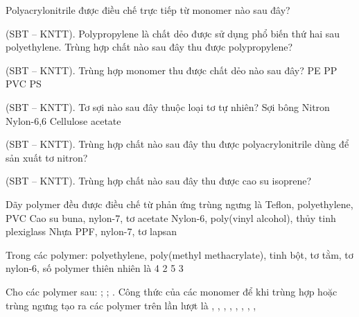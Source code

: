 \documentclass[11pt,a4paper]{article}
\def\loigiai#1{}
\begin{document}
\begin{ex}
Polyacrylonitrile được điều chế trực tiếp từ monomer nào sau đây?
\choice
{}
{}
{}
{}
\loigiai{}
\end{ex}

\begin{ex}
(SBT -- KNTT). Polypropylene là chất dẻo được sử dụng phổ biến thứ hai sau polyethylene. Trùng hợp chất nào sau đây thu được polypropylene?
\choice
{}
{}
{}
{}
\loigiai{}
\end{ex}

\begin{ex}
(SBT -- KNTT). Trùng hợp monomer  thu được chất dẻo nào sau đây?
\choice
{PE}
{PP}
{PVC}
{PS}
\loigiai{}
\end{ex}

\begin{ex}
(SBT -- KNTT). Tơ sợi nào sau đây thuộc loại tơ tự nhiên?
\choice
{Sợi bông}
{Nitron}
{Nylon-6,6}
{Cellulose acetate}
\loigiai{}
\end{ex}

\begin{ex}
(SBT -- KNTT). Trùng hợp chất nào sau đây thu được polyacrylonitrile dùng để sản xuất tơ nitron?
\choice
{}
{}
{}
{}
\loigiai{}
\end{ex}

\begin{ex}
(SBT -- KNTT). Trùng hợp chất nào sau đây thu được cao su isoprene?
\choice
{}
{}
{}
{}
\loigiai{}
\end{ex}

\begin{ex}
Dãy polymer đều được điều chế từ phản ứng trùng ngưng là
\choice
{Teflon, polyethylene, PVC}
{Cao su buna, nylon-7, tơ acetate}
{Nylon-6, poly(vinyl alcohol), thủy tinh plexiglass}
{Nhựa PPF, nylon-7, tơ lapsan}
\loigiai{}
\end{ex}

\newpage

\begin{ex}
Trong các polymer: polyethylene, poly(methyl methacrylate), tinh bột, tơ tằm, tơ nylon-6, số polymer thiên nhiên là
\choice
{4}
{2}
{5}
{3}
\loigiai{}
\end{ex}

\begin{ex}
Cho các polymer sau: ; ; . Công thức của các monomer để khi trùng hợp hoặc trùng ngưng tạo ra các polymer trên lần lượt là
\choice
{, , }
{, , }
{, , }
{, , }
\loigiai{}
\end{ex}
\end{document}
